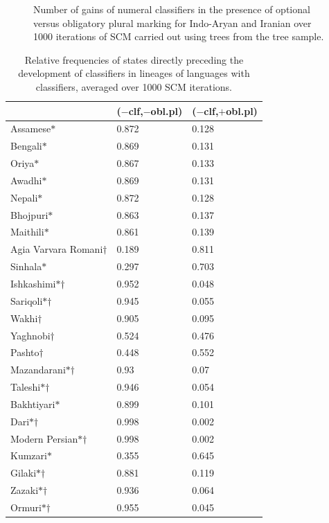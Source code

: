 \documentclass[11pt]{article}
\begin{document}
\begin{figure}[t!]
\begin{minipage}[t]{.45\linewidth}
\end{minipage}
\caption{Number of gains of numeral classifiers in the presence of optional versus obligatory plural marking for Indo-Aryan and Iranian over 1000 iterations of SCM carried out using trees from the tree sample.}
\label{ia_ir_scm}
\end{figure}


\begin{table}[h!]
\centering
\begin{tabular}{|l|ll|}
\hline
 & ($-$clf,$-$obl.pl) & ($-$clf,$+$obl.pl)\\
\hline
Assamese$*$ & 0.872 & 0.128\\
Bengali$*$ & 0.869 & 0.131\\
Oriya$*$ & 0.867 & 0.133\\
Awadhi$*$ & 0.869 & 0.131\\
Nepali$*$ & 0.872 & 0.128\\
Bhojpuri$*$ & 0.863 & 0.137\\
Maithili$*$ & 0.861 & 0.139\\
Agia Varvara Romani$\dagger$ & 0.189 & 0.811\\
Sinhala$*$ & 0.297 & 0.703\\
\hline
Ishkashimi$*$$\dagger$ & 0.952 & 0.048\\
Sariqoli$*$$\dagger$ & 0.945 & 0.055\\
Wakhi$\dagger$ & 0.905 & 0.095\\
Yaghnobi$\dagger$ & 0.524 & 0.476\\
Pashto$\dagger$ & 0.448 & 0.552\\
Mazandarani$*$$\dagger$ & 0.93 & 0.07\\
Taleshi$*$$\dagger$ & 0.946 & 0.054\\
Bakhtiyari$*$ & 0.899 & 0.101\\
Dari$*$$\dagger$ & 0.998 & 0.002\\
Modern Persian$*$$\dagger$ & 0.998 & 0.002\\
Kumzari$*$ & 0.355 & 0.645\\
Gilaki$*$$\dagger$ & 0.881 & 0.119\\
Zazaki$*$$\dagger$ & 0.936 & 0.064\\
Ormuri$*$$\dagger$ & 0.955 & 0.045\\
\hline
\end{tabular}
\caption{Relative frequencies of states directly preceding the development of classifiers in lineages of languages with classifiers, averaged over 1000 SCM iterations.}
\label{prev_state}
\end{table}
\end{document}
